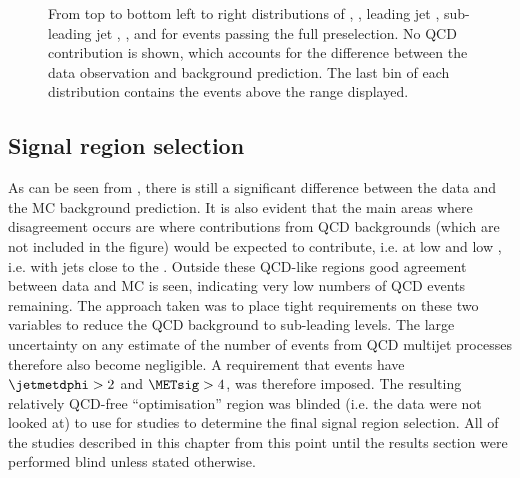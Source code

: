 \begin{figure}
  \caption{From top to bottom left to right distributions of \detajj, \Mjj, leading jet \pt, sub-leading jet \pt, \METnoMU, \METsig and \jetmetdphi for events passing the full preselection. No \ac{QCD} contribution is shown, which accounts for the difference between the data observation and background prediction. The last bin of each distribution contains the events above the range displayed.}
  \label{fig:parkedpostpresel}
\end{figure}




\subsection{Signal region selection}
\label{sec:parkedsigsel}
As can be seen from , there is still a significant difference between the data and the \ac{MC} background prediction. It is also evident that the main areas where disagreement occurs are where contributions from \ac{QCD} backgrounds (which are not included in the figure) would be expected to contribute, i.e. at low \METsig and low \jetmetdphi, i.e. with jets close to the \METnoMU. Outside these \ac{QCD}-like regions good agreement between data and \ac{MC} is seen, indicating very low numbers of \ac{QCD} events remaining. The approach taken was to place tight requirements on these two variables to reduce the \ac{QCD} background to sub-leading levels. The large uncertainty on any estimate of the number of events from \ac{QCD} multijet processes therefore also become negligible. A requirement that events have $\jetmetdphi>2$ and $\METsig>4$, was therefore imposed. The resulting relatively \ac{QCD}-free ``optimisation'' region was blinded (i.e. the data were not looked at) to use for studies to determine the final signal region selection. All of the studies described in this chapter from this point until the results section were performed blind unless stated otherwise.


